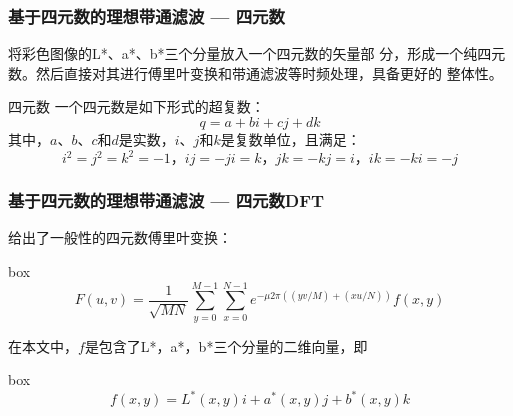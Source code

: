 \documentclass[xcolor=svgnames,serif,table]{beamer}
\begin{document}
\begin{frame}
  \frametitle{基于四元数的理想带通滤波 --- 四元数}
  将彩色图像的L*、a*、b*三个分量放入一个四元数\cite{hamilton1866elements}的矢量部
分，形成一个纯四元数。然后直接对其进行傅里叶变换和带通滤波等时频处理，具备更好的
整体性。

\medskip

\medskip
\begin{block}{四元数}
  一个四元数是如下形式的超复数：
  \begin{equation}
    \label{eq:quaternion}
    q=a+bi+cj+dk
  \end{equation}
  其中，$a$、$b$、$c$和$d$是实数，$i$、$j$和$k$是复数单位，且满足：
  \begin{equation}
  \label{eq:ijk}
  i^2=j^2=k^2=-1\mbox{，}ij=-ji=k\mbox{，}jk=-kj=i\mbox{，}ik=-ki=-j
\end{equation}
\end{block}
\end{frame}

\begin{frame}
  \frametitle{基于四元数的理想带通滤波 --- 四元数DFT}
  \cite{sangwine2000discrete}给出了一般性的四元数傅里叶变换：
\begin{beamercolorbox}[shadow=true,sep=0pt,rounded=true]{box}  
\begin{equation}
  \label{eq:quaternion-dft}
  F(u,v)=\frac{1}{\sqrt{MN}}\sum_{y=0}^{M-1}\sum_{x=0}^{N-1}e^{-\mu 2\pi((yv/M)+(xu/N))}f(x,y)
\end{equation}
\end{beamercolorbox}

在本文中，$f$是包含了L*，a*，b*三个分量的二维向量，即
\begin{beamercolorbox}[shadow=true,sep=0pt,rounded=true]{box}  
\begin{equation}
  \label{eq:quaternion-lab}
  f(x,y)=L^{*}(x,y)i+a^{*}(x,y)j+b^{*}(x,y)k
\end{equation}
\end{beamercolorbox}
\end{frame}
\end{document}
